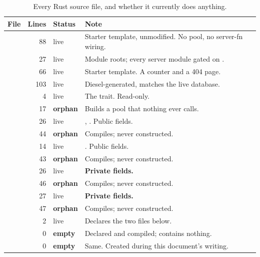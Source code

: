 \begin{table}[htbp]
\centering
\caption{Every Rust source file, and whether it currently does anything.}
\label{tab:inventory}
\small
\begin{tabular}{@{}L{0.325\textwidth}rL{0.13\textwidth}L{0.36\textwidth}@{}}
\toprule
\textbf{File} & \textbf{Lines} & \textbf{Status} & \textbf{Note} \\
\midrule
{}          & 88 & live & Starter template, unmodified. No pool, no server-fn wiring. \\
           & 27 & live & Module roots; every server module gated on . \\
           & 66 & live & Starter template. A counter and a 404 page. \\
        & 103 & live & Diesel-generated, matches the live database. \\
\midrule
{}      & 4 & live & The  trait. Read-only. \\
 & 17 & \textbf{orphan} & Builds a pool that nothing ever calls. \\
\midrule
{} & 26 & live & , . Public fields. \\
 & 44 & \textbf{orphan} & Compiles; never constructed. \\
 & 14 & live & . Public fields. \\
 & 43 & \textbf{orphan} & Compiles; never constructed. \\
 & 26 & live & \textbf{Private fields.} \\
 & 46 & \textbf{orphan} & Compiles; never constructed. \\
 & 27 & live & \textbf{Private fields.} \\
 & 47 & \textbf{orphan} & Compiles; never constructed. \\
\midrule
{} & 2 & live & Declares the two files below. \\
 & 0 & \textbf{empty} & Declared and compiled; contains nothing. \\
 & 0 & \textbf{empty} & Same. Created during this
document's writing. \\
\bottomrule
\end{tabular}
\end{table}

